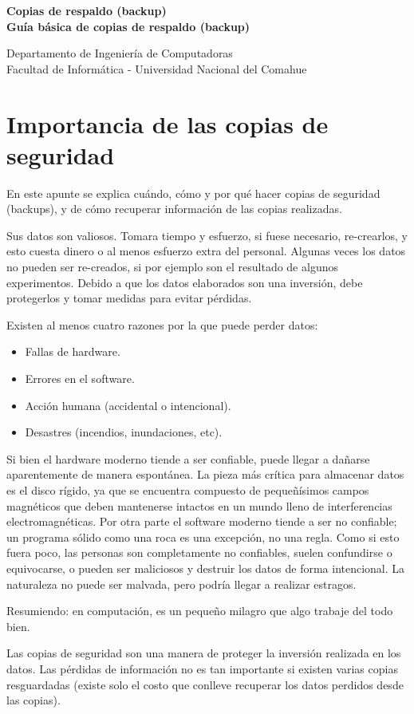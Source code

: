 ﻿\documentclass[12pt]{article}
\def\maketitle{

 \makeatletter
 {\color{bl} \centering \huge \sc \textbf{
 Copias de respaldo (backup)\\ 
\large \vspace*{-8pt} \color{black} Guía básica de copias de respaldo (backup)
 \vspace*{8pt} }\par}
 \makeatother


 \makeatletter
 {\centering \small 
 	Departamento de Ingeniería de Computadoras \\
 	Facultad de Informática - Universidad Nacional del Comahue \\
 	\vspace{20pt} }
 \makeatother

}
\begin{document}
\thispagestyle{empty}
\maketitle
\setlength{\parindent}{0pt}


\section{Importancia de las copias de seguridad}
 En este apunte se explica cuándo, cómo y  por qué hacer copias de 
seguridad (backups), y de cómo recuperar información de las 
copias realizadas.

Sus datos son valiosos. Tomara tiempo y esfuerzo, si fuese necesario,
re-crearlos, y esto cuesta dinero o al menos esfuerzo extra del personal.
Algunas veces los datos no pueden ser re-creados, si por ejemplo son el 
resultado de algunos experimentos. Debido a que los datos elaborados son una 
inversión, debe protegerlos y tomar medidas para evitar pérdidas.

Existen al menos cuatro razones por la que puede perder datos: 
\begin{itemize}
\item Fallas de hardware.
\item Errores en el software. 
\item Acción humana (accidental o intencional). 
\item Desastres (incendios, inundaciones, etc). 
\end{itemize}

 Si bien el hardware moderno tiende a ser confiable, puede llegar a dañarse
aparentemente de manera espontánea. La pieza más crítica para 
almacenar datos es el disco rígido, ya que se encuentra compuesto de 
pequeñísimos campos magnéticos que deben mantenerse intactos en un mundo 
lleno de interferencias electromagnéticas.  
Por otra parte el software moderno tiende a ser no confiable; un programa 
sólido como una roca es una excepción, no una regla. Como si esto fuera 
poco, las personas son completamente no confiables, suelen confundirse o 
equivocarse, o pueden ser maliciosos y destruir los datos de forma 
intencional. La naturaleza no puede ser malvada, pero podría llegar a 
realizar estragos. 

Resumiendo: en computación, es un pequeño milagro que algo trabaje del todo bien.

	

Las copias de seguridad son una manera de proteger la inversión realizada en 
los datos. Las pérdidas de información no es tan importante si existen varias
copias resguardadas (existe solo el costo que conlleve recuperar los datos 
perdidos desde las copias).
\end{document}
